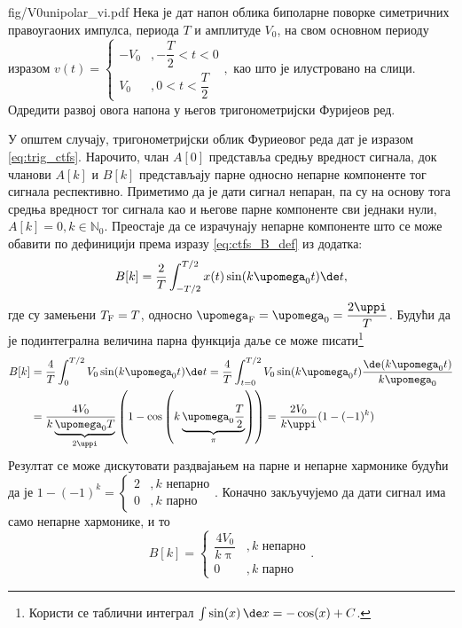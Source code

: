 \PID \label{z:pravougani_po_def}
\begin{slikaDesno}{fig/V0unipolar_vi.pdf}
Нека је дат напон облика биполарне поворке симетричних правоугаоних импулса, периода $T$ и амплитуде $V_0$, 
на свом основном периоду изразом
$
v(t) = 
\begin{cases}
    -V_0 &, -\dfrac{T}{2} < t < 0 \\[2mm]
    V_0  &, 0 < t < \dfrac{T}{2}
\end{cases},
$ као што је илустровано на слици. Одредити развој овога напона у његов тригонометријски Фуријеов ред.
\end{slikaDesno}
%
\RESENJE
У општем случају, тригонометријски облик Фуриеовог реда дат је изразом \eqref{eq:trig_ctfs}. Нарочито, члан 
$A[0]$ представља средњу вредност сигнала, док чланови $A[k]$ и $B[k]$ представљају парне односно непарне 
компоненте тог сигнала респективно. Приметимо да је дати сигнал непаран, па су на основу тога средња вредност 
тог сигнала као и његове парне компоненте сви једнаки нули, $A[k] = 0, k \in \mathbb N_0$. Преостаје да се 
израчунају непарне компоненте што се може обавити по дефиницији према изразу \eqref{eq:ctfs_B_def} из додатка: 
\begin{eqnarray}
    B[k] = \dfrac{2}{T}\int_{-T/2}^{T/2} x(t) \sin(k\upomega_0 t) \de t, 
\end{eqnarray}
где су замењени $T_{\rm F} = T$, односно $\upomega_{\rm F} = \upomega_0 = \dfrac{2\uppi}{T}$. Будући да је 
подинтегрална величина парна функција даље се  може писати\footnote{Користи се таблични 
интеграл $\int \sin(x)\,\de x = -\cos(x) + C$.}
\begin{align}
    B[k] &= \dfrac{4}{T} \int_0^{T/2} V_0 \sin(k\upomega_0 t) \de t 
         = \dfrac{4}{T} \int_{t = 0}^{T/2} V_0 \sin(k\upomega_0 t) \dfrac{ \de(k \upomega_0 t) }{k \upomega_0} 
         \\
         &= \dfrac{4V_0}{k \underbrace{\upomega_0 T}_{2\uppi}} \left( 1 - \cos\left( k \underbrace{\upomega_0 \dfrac{T}{2}}_{\pi} \right) \right)
         = \dfrac{2V_0}{k\uppi} ( 1 - (-1)^k )
\end{align}
Резултат се може дискутовати раздвајањем на парне и непарне хармонике будући да је 
$1 - (-1)^k = 
\begin{cases}
    2 &, k \text{ непарно} \\
    0 &, k \text{ парно}
\end{cases}$. \vspace*{1mm}
Коначно закључујемо да дати сигнал има само непарне хармонике, и то 
\begin{equation}
B[k] = 
\begin{cases}
    \dfrac{4V_0}{k\uppi} &, k \text{ непарно} \\[2mm]
    0 &, k \text{ парно}
\end{cases}.
\end{equation}
